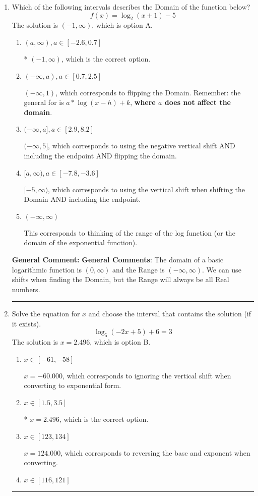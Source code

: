 \documentclass{extbook}[14pt]
\newcommand{\litem}[1]{\item #1

\rule{\textwidth}{0.4pt}}
\begin{document}
\begin{enumerate}\litem{
Which of the following intervals describes the Domain of the function below?
\[ f(x) = \log_2{(x+1)}-5 \]The solution is \( (-1, \infty) \), which is option A.\begin{enumerate}[label=\Alph*.]
\item \( (a, \infty), a \in [-2.6, 0.7] \)

* $(-1, \infty)$, which is the correct option.
\item \( (-\infty, a), a \in [0.7, 2.5] \)

$(-\infty, 1)$, which corresponds to flipping the Domain. Remember: the general for is $a*\log(x-h)+k$, \textbf{where $a$ does not affect the domain}.
\item \( (-\infty, a], a \in [2.9, 8.2] \)

$(-\infty, 5]$, which corresponds to using the negative vertical shift AND including the endpoint AND flipping the domain.
\item \( [a, \infty), a \in [-7.8, -3.6] \)

$[-5, \infty)$, which corresponds to using the vertical shift when shifting the Domain AND including the endpoint.
\item \( (-\infty, \infty) \)

This corresponds to thinking of the range of the log function (or the domain of the exponential function).
\end{enumerate}

\textbf{General Comment:} \textbf{General Comments}: The domain of a basic logarithmic function is $(0, \infty)$ and the Range is $(-\infty, \infty)$. We can use shifts when finding the Domain, but the Range will always be all Real numbers.
}
\litem{
Solve the equation for $x$ and choose the interval that contains the solution (if it exists).
\[ \log_{5}{(-2x+5)}+6 = 3 \]The solution is \( x = 2.496 \), which is option B.\begin{enumerate}[label=\Alph*.]
\item \( x \in [-61, -58] \)

$x = -60.000$, which corresponds to ignoring the vertical shift when converting to exponential form.
\item \( x \in [1.5, 3.5] \)

* $x = 2.496$, which is the correct option.
\item \( x \in [123, 134] \)

$x = 124.000$, which corresponds to reversing the base and exponent when converting.
\item \( x \in [116, 121] \)


\end{enumerate}}
\end{enumerate}
\end{document}
